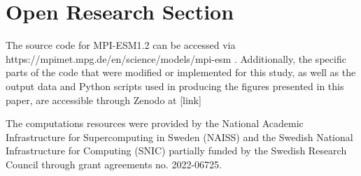 \documentclass[draft]{agujournal2019}
\begin{document}




%
%

\section*{Open Research Section}
The source code for MPI-ESM1.2 can be accessed via https://mpimet.mpg.de/en/science/models/mpi-esm \cite{Mauritsen_2019}. Additionally, the specific parts of the code that were modified or implemented for this study, as well as the output data and Python scripts used in producing the figures presented in this paper, are accessible through Zenodo at [link] \cite{}




\acknowledgments
The computations resources were provided by the National Academic Infrastructure for Supercomputing in Sweden (NAISS) and the Swedish National Infrastructure for Computing (SNIC) partially funded by the Swedish Research Council through grant agreements no. 2022-06725.


%
 
%
\end{document}
